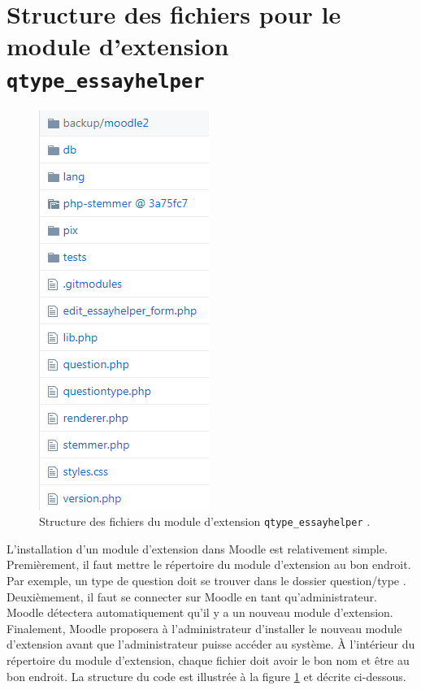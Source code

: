 \section{Structure des fichiers pour le module d'extension \texttt{qtype\_essayhelper}}
\begin{figure}[htbp]
   \begin{center}
  \includegraphics[scale=1]{images/architecture.png}
  \end{center}
  \caption{Structure des fichiers du module d'extension \texttt{qtype\_essayhelper} .}
  \label{dev-architecture}
\end{figure}

L'installation d'un module d'extension dans Moodle est relativement simple.
Premi\`erement, il faut mettre le r\'epertoire du module d'extension au bon endroit.
Par exemple, un type de question doit se trouver dans le dossier \og question/type \fg{}.
Deuxi\`emement, il faut se connecter sur Moodle en tant qu'administrateur.
Moodle d\'etectera automatiquement qu'il y a un nouveau module d'extension.
Finalement, Moodle proposera \`a l'administrateur d'installer le nouveau module d'extension avant que l'administrateur puisse acc\'eder au syst\`eme.
\`A l'int\'erieur du r\'epertoire du module d'extension, chaque fichier doit avoir le bon nom et \^etre au bon endroit.
La structure du code est illustr\'ee \`a la figure \ref{dev-architecture} et d\'ecrite ci-dessous.
 
